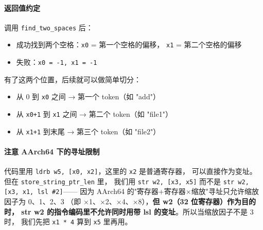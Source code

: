 \paragraph{返回值约定}
调用 \texttt{find\_two\_spaces} 后：
\begin{itemize}
    \item 成功找到两个空格：\texttt{x0} = 第一个空格的偏移，
        \texttt{x1} = 第二个空格的偏移
    \item 失败：\texttt{x0 = -1, x1 = -1}
\end{itemize}

有了这两个位置，后续就可以做简单切分：
\begin{itemize}
    \item 从 0 到 \texttt{x0} 之间 → 第一个 token（如 "add"）
    \item 从 \texttt{x0+1} 到 \texttt{x1} 之间 → 第二个 token（如 "file1"）
    \item 从 \texttt{x1+1} 到末尾 → 第三个 token（如 "file2"）
\end{itemize}

\paragraph{注意 AArch64 下的寻址限制}
代码里用 \texttt{ldrb w5, [x0, x2]}，这里的 \texttt{x2} 是普通寄存器，
可以直接作为变址。但在 \texttt{store\_string\_ptr\_len} 里，
我们用 \texttt{str w2, [x3, x5]} 而不是 \texttt{str w2, [x3, x1, lsl \#2]}——
因为 AArch64 的"寄存器+寄存器×缩放"寻址只允许缩放因子为 0、1、2、3
（即 ×1、×2、×4、×8），\textbf{但 w2（32 位寄存器）作为目的时，
str w2 的指令编码里不允许同时用带 lsl 的变址}。所以当缩放因子不是 3 时，
我们先把 \texttt{x1 * 4} 算到 \texttt{x5} 里再用。
